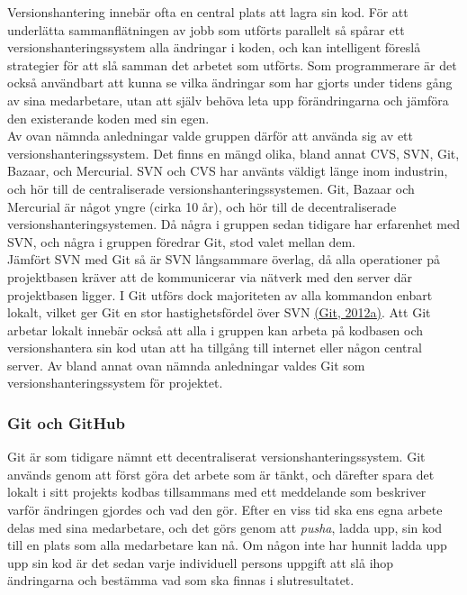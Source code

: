 \documentclass[a4paper,11pt]{article}
\begin{document}
Versionshantering innebär ofta en central plats att lagra sin kod. För att underlätta sammanflätningen av jobb som utförts parallelt så spårar ett versionshanteringssystem alla ändringar i koden, och kan intelligent föreslå strategier för att slå samman det arbetet som utförts. Som programmerare är det också användbart att kunna se vilka ändringar som har gjorts under tidens gång av sina medarbetare, utan att själv behöva leta upp förändringarna och jämföra den existerande koden med sin egen.\\

Av ovan nämnda anledningar valde gruppen därför att använda sig av ett versionshanteringssystem. Det finns en mängd olika, bland annat CVS, SVN, Git, Bazaar, och Mercurial. SVN och CVS har använts väldigt länge inom industrin, och hör till de centraliserade versionshanteringssystemen. Git, Bazaar och Mercurial är något yngre (cirka 10 år), och hör till de decentraliserade versionshanteringsystemen. Då några i gruppen sedan tidigare har erfarenhet med SVN, och några i gruppen föredrar Git, stod valet mellan dem.\\

Jämfört SVN med Git så är SVN långsammare överlag, då alla operationer på projektbasen kräver att de kommunicerar via nätverk med den server där projektbasen ligger. I Git utförs dock majoriteten av alla kommandon enbart lokalt, vilket ger Git en stor hastighetsfördel över SVN \hyperref[git]{(Git, 2012a)}. Att Git arbetar lokalt innebär också att alla i gruppen kan arbeta på kodbasen och versionshantera sin kod utan att ha tillgång till internet eller någon central server. Av bland annat ovan nämnda anledningar valdes Git som versionshanteringssystem för projektet.

\subsubsection{Git och GitHub}
Git är som tidigare nämnt ett decentraliserat versionshanteringssystem. Git används genom att först göra det arbete som är tänkt, och därefter spara det lokalt i sitt projekts kodbas tillsammans med ett meddelande som beskriver varför ändringen gjordes och vad den gör. Efter en viss tid ska ens egna arbete delas med sina medarbetare, och det görs genom att {\it pusha}, ladda upp, sin kod till en plats som alla medarbetare kan nå. Om någon inte har hunnit ladda upp upp sin kod är det sedan varje individuell persons uppgift att slå ihop ändringarna och bestämma vad som ska finnas i slutresultatet.\\
\end{document}
